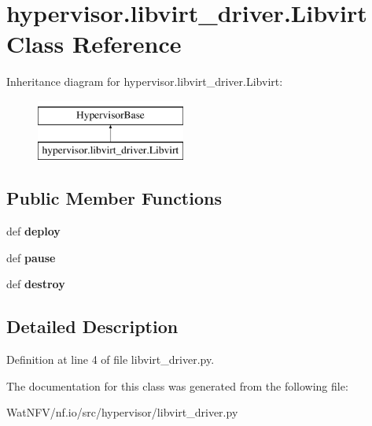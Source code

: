 \hypertarget{classhypervisor_1_1libvirt__driver_1_1Libvirt}{\section{hypervisor.\-libvirt\-\_\-driver.\-Libvirt Class Reference}
\label{classhypervisor_1_1libvirt__driver_1_1Libvirt}
}
Inheritance diagram for hypervisor.\-libvirt\-\_\-driver.\-Libvirt\-:\begin{figure}[H]
\begin{center}
\leavevmode
\includegraphics[height=2.000000cm]{classhypervisor_1_1libvirt__driver_1_1Libvirt}
\end{center}
\end{figure}
\subsection*{Public Member Functions}
\begin{DoxyCompactItemize}
\item 
\hypertarget{classhypervisor_1_1libvirt__driver_1_1Libvirt_ab8f6a87c28e570ecc55693e665b915fa}{def {\bfseries deploy}}\label{classhypervisor_1_1libvirt__driver_1_1Libvirt_ab8f6a87c28e570ecc55693e665b915fa}

\item 
\hypertarget{classhypervisor_1_1libvirt__driver_1_1Libvirt_ae82b6fcef27839a8db06edfb0857ee9e}{def {\bfseries pause}}\label{classhypervisor_1_1libvirt__driver_1_1Libvirt_ae82b6fcef27839a8db06edfb0857ee9e}

\item 
\hypertarget{classhypervisor_1_1libvirt__driver_1_1Libvirt_a48a5b9aa63f54fff5c4bcfd2dbdf104a}{def {\bfseries destroy}}\label{classhypervisor_1_1libvirt__driver_1_1Libvirt_a48a5b9aa63f54fff5c4bcfd2dbdf104a}

\end{DoxyCompactItemize}


\subsection{Detailed Description}


Definition at line 4 of file libvirt\-\_\-driver.\-py.



The documentation for this class was generated from the following file\-:\begin{DoxyCompactItemize}
\item 
Wat\-N\-F\-V/nf.\-io/src/hypervisor/libvirt\-\_\-driver.\-py\end{DoxyCompactItemize}
